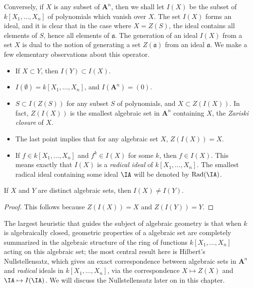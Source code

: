 Conversely, if $X$ is any subset of $\mathbf{A}^n$, then we shall let $I(X)$ be the subset of $k[X_1, \dots, X_n]$ of polynomials which vanish over $X$. The set $I(X)$ forms an ideal, and it is clear that in the case where $X = Z(S)$, the ideal contains all elements of $S$, hence all elements of $\mathfrak{a}$. The generation of an ideal $I(X)$ from a set $X$ is dual to the notion of generating a set $Z(\mathfrak{a})$ from an ideal $\mathfrak{a}$. We make a few elementary observations about this operator.
%
\begin{itemize}
    \item If $X \subset Y$, then $I(Y) \subset I(X)$.
    \item $I(\emptyset) = k[X_1, \dots, X_n]$, and $I(\mathbf{A}^n) = (0)$.
    \item $S \subset I(Z(S))$ for any subset $S$ of polynomials, and $X \subset Z(I(X))$. In fact, $Z(I(X))$ is the smallest algebraic set in $\mathbf{A}^n$ containing $X$, the \emph{Zariski closure} of $X$.
    \item The last point implies that for any algebraic set $X$, $Z(I(X)) = X$.%
    \item If $f \in k[X_1,\dots,X_n]$ and $f^k \in I(X)$ for some $k$, then $f \in I(X)$. This means exactly that $I(X)$ is a \emph{radical ideal} of $k[X_1,\dots,X_n]$. The smallest radical ideal containing some ideal $\IA$ will be denoted by $\text{Rad}(\IA)$.
\end{itemize}

\begin{prop}
    If $X$ and $Y$ are distinct algebraic sets, then $I(X) \neq I(Y)$.
\end{prop}
\begin{proof}
    This follows because $Z(I(X)) = X$ and $Z(I(Y)) = Y$.
\end{proof}

The largest heuristic that guides the subject of algebraic geometry is that when $k$ is algebraically closed, geometric properties of a algebraic set are completely summarized in the algebraic structure of the ring of functions $k[X_1,\dots,X_n]$ acting on this algebraic set; the most central result here is Hilbert's Nullstellensatz, which gives an exact correspondence between algebraic sets in $\mathbf{A}^n$ and \emph{radical} ideals in $k[X_1,\dots,X_n]$, via the correspondence $X \mapsto Z(X)$ and $\IA \mapsto I(\IA)$. We will discuss the Nullstellensatz later on in this chapter.

